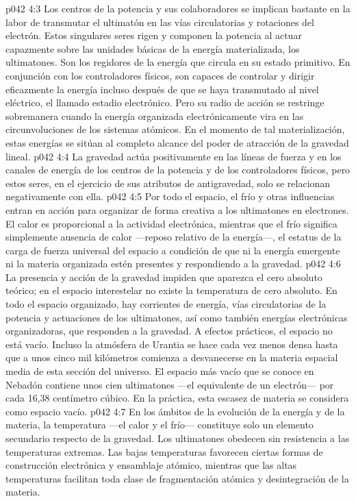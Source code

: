 \vs p042 4:3 Los centros de la potencia y sus colaboradores se implican bastante en la labor de transmutar el ultimatón en las vías circulatorias y rotaciones del electrón. Estos singulares seres rigen y componen la potencia al actuar capazmente sobre las unidades básicas de la energía materializada, los ultimatones. Son los regidores de la energía que circula en su estado primitivo. En conjunción con los controladores físicos, son capaces de controlar y dirigir eficazmente la energía incluso después de que se haya transmutado al nivel eléctrico, el llamado estadio electrónico. Pero su radio de acción se restringe sobremanera cuando la energía organizada electrónicamente vira en las circunvoluciones de los sistemas atómicos. En el momento de tal materialización, estas energías se sitúan al completo alcance del poder de atracción de la gravedad lineal.
\vs p042 4:4 La gravedad actúa positivamente en las líneas de fuerza y en los canales de energía de los centros de la potencia y de los controladores físicos, pero estos seres, en el ejercicio de sus atributos de antigravedad, solo se relacionan negativamente con ella.
\vs p042 4:5 Por todo el espacio, el frío y otras influencias entran en acción para organizar de forma creativa a los ultimatones en electrones. El calor es proporcional a la actividad electrónica, mientras que el frío significa simplemente ausencia de calor ---reposo relativo de la energía---, el estatus de la carga de fuerza universal del espacio a condición de que ni la energía emergente ni la materia organizada estén presentes y respondiendo a la gravedad.
\vs p042 4:6 La presencia y acción de la gravedad impiden que aparezca el cero absoluto teórico; en el espacio interestelar no existe la temperatura de cero absoluto. En todo el espacio organizado, hay corrientes de energía, vías circulatorias de la potencia y actuaciones de los ultimatones, así como también energías electrónicas organizadoras, que responden a la gravedad. A efectos prácticos, el espacio no está vacío. Incluso la atmósfera de Urantia se hace cada vez menos densa hasta que a unos cinco mil kilómetros comienza a desvanecerse en la materia espacial media de esta sección del universo. El espacio más vacío que se conoce en Nebadón contiene unos cien ultimatones ---el equivalente de un electrón--- por cada 16,38 centímetro cúbico. En la práctica, esta escasez de materia se considera como espacio vacío.
\vs p042 4:7 En los ámbitos de la evolución de la energía y de la materia, la temperatura ---el calor y el frío--- constituye solo un elemento secundario respecto de la gravedad. Los ultimatones obedecen sin resistencia a las temperaturas extremas. Las bajas temperaturas favorecen ciertas formas de construcción electrónica y ensamblaje atómico, mientras que las altas temperaturas facilitan toda clase de fragmentación atómica y desintegración de la materia.
